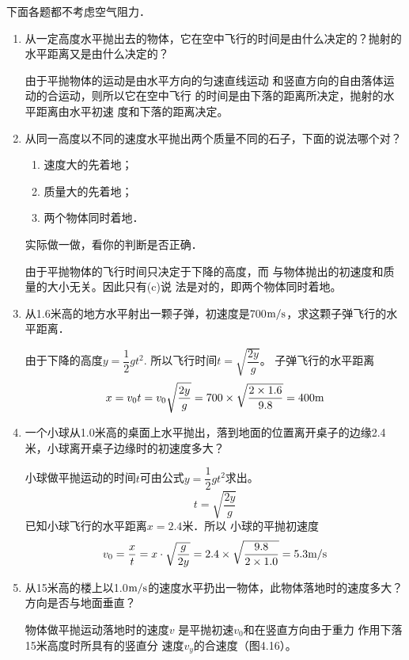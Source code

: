 下面各题都不考虑空气阻力．
\begin{enumerate}
\item 从一定高度水平抛出去的物体，它在空中飞行的时间是由什么决定的？抛射的水平距离又是由什么决定的？


\begin{solution}
    由于平抛物体的运动是由水平方向的匀速直线运动
    和竖直方向的自由落体运动的合运动，则所以它在空中飞行
    的时间是由下落的距离所决定，抛射的水平距离由水平初速
    度和下落的距离决定。
\end{solution}
\item 从同一高度以不同的速度水平抛出两个质量不同的石子，下面的说法哪个对？
\begin{enumerate}
	\item 速度大的先着地；
	\item  质量大的先着地；
	\item 两个物体同时着地．
\end{enumerate}
实际做一做，看你的判断是否正确．

\begin{solution}
    由于平抛物体的飞行时间只决定于下降的高度，而
    与物体抛出的初速度和质量的大小无关。因此只有(c)说
    法是对的，即两个物体同时着地。
\end{solution}
\item 从1.6米高的地方水平射出一颗子弹，初速度是700$\text{m}/\text{s}$，求这颗子弹飞行的水平距离．

\begin{solution}
    由于下降的高度$y=\dfrac{1}{2}gt^2$. 所以飞行时间$t=\sqrt{\dfrac{2y}{g}}$。
    子弹飞行的水平距离
\[x=v_0t=v_0\sqrt{\dfrac{2y}{g}}=700\times \sqrt{\frac{2\times 1.6}{9.8}}=400{\rm m}\]
\end{solution}
\item 一个小球从1.0米高的桌面上水平抛出，落到地面的位置离开桌子的边缘2.4米，小球离开桌子边缘时的初速度多大？

\begin{solution}
小球做平抛运动的时间$t$可由公式$y=\dfrac{1}{2}gt^2$求出。
\[t=\sqrt{\frac{2y}{g}}\]
已知小球飞行的水平距离$x=2.4$米．所以
小球的平抛初速度
\[v_0=\frac{x}{t}=x\cdot \sqrt{\frac{g}{2y}}=2.4\times \sqrt{\frac{9.8}{2\times 1.0}}=5.3\text{m}/\text{s}\]
\end{solution}
\item 从15米高的楼上以1.0$\text{m}/\text{s}$的速度水平扔出一物体，此物体落地时的速度多大？方向是否与地面垂直？

\begin{solution}
    物体做平抛运动落地时的速度$v$
    是平抛初速$v_0$和在竖直方向由于重力
    作用下落15米高度时所具有的竖直分
    速度$v_y$的合速度（图4.16）。
\begin{figure}[htp]
    \centering
{}
    \caption{}
\end{figure}    
    

\end{solution}
\end{enumerate}
